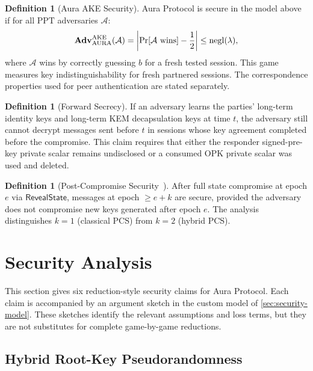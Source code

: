 \documentclass[preprint,12pt]{elsarticle}
\theoremstyle{definition}
\newtheorem{definition}[theorem]{Definition}
\newcommand{\tech}[1]{\textnormal{#1}}
\newcommand{\secpar}{\lambda}
\newcommand{\negl}{\mathrm{negl}}
\newcommand{\ppt}{\mathrm{PPT}}
\newcommand{\adv}{\mathbf{Adv}}
\newcommand{\advA}{\mathcal{A}}
\newcommand{\AKE}{\tech{AKE}}
\begin{document}
\begin{definition}[Aura AKE Security]\label{def:ake}
Aura Protocol is secure in the model above if for all $\ppt$ adversaries $\advA$:
\begin{equation}\label{eq:eck-advantage}
  \adv^{\AKE}_{\mathrm{AURA}}(\advA) = \left|\Pr[\advA \text{ wins}] - \frac{1}{2}\right| \leq \negl(\secpar),
\end{equation}
where $\advA$ wins by correctly guessing $b$ for a fresh tested session.
This game measures key indistinguishability for fresh partnered sessions. The
correspondence properties used for peer authentication are stated separately.
\end{definition}

\begin{definition}[Forward Secrecy]\label{def:fs}
If an adversary learns the parties' long-term identity keys and
long-term KEM decapsulation keys at time $t$, the adversary still
cannot decrypt messages sent before $t$ in sessions whose key agreement
completed before the compromise. This claim requires that either the
responder signed-pre-key private scalar remains undisclosed or a
consumed OPK private scalar was used and deleted.
\end{definition}

\begin{definition}[Post-Compromise Security~\cite{cohn-gordon2020}]\label{def:pcs}
After full state compromise at epoch $e$ via $\textsf{RevealState}$, messages at epoch $\geq e + k$ are secure, provided the adversary does not compromise new keys generated after epoch $e$. The analysis distinguishes $k = 1$ (classical PCS) from $k = 2$ (hybrid PCS).
\end{definition}


\section{Security Analysis}\label{sec:proofs}

This section gives six reduction-style security claims for Aura Protocol. Each
claim is accompanied by an argument sketch in the custom model of
\cref{sec:security-model}. These sketches identify the relevant assumptions and
loss terms, but they are not substitutes for complete game-by-game reductions.

\subsection{Hybrid Root-Key Pseudorandomness}\label{sec:thm1}
\end{document}
